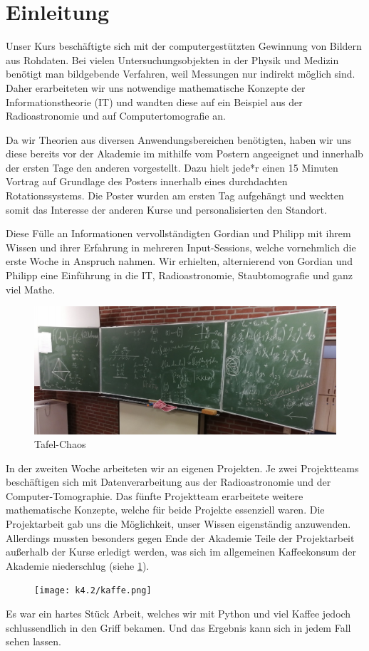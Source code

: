 \section{Einleitung}

Unser Kurs beschäftigte sich mit der computergestützten Gewinnung von Bildern aus Rohdaten. Bei vielen Untersuchungsobjekten in der Physik und Medizin benötigt man bildgebende Verfahren, weil Messungen nur indirekt möglich sind. Daher erarbeiteten wir uns notwendige mathematische Konzepte der Informationstheorie (IT) und wandten diese auf ein Beispiel aus der Radioastronomie und auf Computertomografie an.

Da wir Theorien aus diversen Anwendungsbereichen benötigten, haben wir uns diese bereits vor der Akademie im mithilfe vom Postern angeeignet und innerhalb der ersten Tage den anderen vorgestellt. Dazu hielt jede*r einen 15 Minuten Vortrag auf Grundlage des Posters innerhalb eines durchdachten Rotationssystems. Die Poster wurden am ersten Tag aufgehängt und weckten somit das Interesse der anderen Kurse und personalisierten den Standort.

Diese Fülle an Informationen vervollständigten Gordian und Philipp mit ihrem Wissen und ihrer Erfahrung in mehreren Input-Sessions, welche vornehmlich die erste Woche in Anspruch nahmen. Wir erhielten, alternierend von Gordian und Philipp eine Einführung in die IT, Radioastronomie, Staubtomografie und ganz viel Mathe.

\begin{figure}[htb]
    \centering
    \includegraphics{k4.2/tafelbild.png}
    \caption{Tafel-Chaos}
\end{figure}


In der zweiten Woche arbeiteten wir an eigenen Projekten. Je zwei Projektteams beschäftigen sich mit Datenverarbeitung aus der Radioastronomie und der Computer-Tomographie. Das fünfte Projektteam erarbeitete weitere mathematische Konzepte, welche für beide Projekte essenziell waren. Die Projektarbeit gab uns die Möglichkeit, unser Wissen eigenständig anzuwenden. Allerdings mussten besonders gegen Ende der Akademie Teile der Projektarbeit außerhalb der Kurse erledigt werden, was sich im allgemeinen Kaffeekonsum der Akademie niederschlug (siehe \cref{k4.2.kaffe}).

\begin{figure}[htb]
    \centering
    \texttt{[image: k4.2/kaffe.png]}
    \label{k4.2.kaffe}
\end{figure}

Es war ein hartes Stück Arbeit, welches wir mit Python und viel Kaffee jedoch schlussendlich in den Griff bekamen. Und das Ergebnis kann sich in jedem Fall sehen lassen.